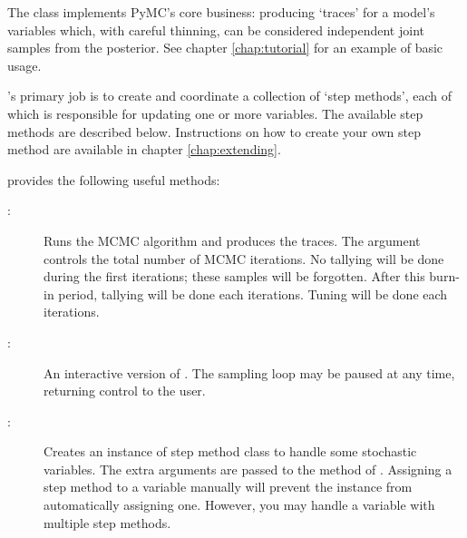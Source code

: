 The  class implements PyMC's core business: producing `traces' for a model's variables which, with careful thinning, can be considered independent joint samples from the posterior. See chapter \ref{chap:tutorial} for an example of basic usage.

's primary job is to create and coordinate a collection of `step methods', each of which is responsible for updating one or more variables. The available step methods are described below. Instructions on how to create your own step method are available in chapter \ref{chap:extending}.

 provides the following useful methods:
\begin{description}
    \item[:] Runs the MCMC algorithm and produces the traces. The  argument controls the total number of MCMC iterations. No tallying will be done during the first  iterations; these samples will be forgotten. After this burn-in period, tallying will be done each  iterations. Tuning will be done each  iterations.
    \item[:] An interactive version of . The sampling loop may be paused at any time, returning control to the user.
    \item[:] Creates an instance of step method class  to handle some stochastic variables. The extra arguments are passed to the  method of . Assigning a step method to a variable manually will prevent the  instance from automatically assigning one. However, you may handle a variable with multiple step methods.


\end{description}

